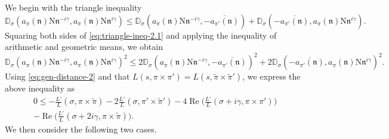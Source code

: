 \documentclass[12pt,reqno]{amsart}
\renewcommand{\tilde}{\widetilde}
\theoremstyle{remark}
\renewcommand{\tilde}{\widetilde}
\DeclareMathOperator{\Real}{Re}
\renewcommand{\tilde}{\widetilde}
\newcommand{\N}{\mathrm{N}}
\newcommand{\kn}{\mathfrak{n}}
\numberwithin{equation}{section}
\begin{document}
    We begin with the triangle inequality
	\begin{equation}
		\label{eq:triangle-ineq-2.1}
		\mathbb{D}_{\sigma}(a_{\pi}(\kn)\N\kn^{-i\gamma}, a_{\pi}(\kn)\N\kn^{i\gamma}) \le \mathbb{D}_{\sigma}(a_{\pi}(\kn)\N\kn^{-i\gamma}, -\overline{a_{\pi'}(\kn)}) +
		\mathbb{D}_{\sigma}(-\overline{a_{\pi'}(\kn)}, a_{\pi}(\kn)\N\kn^{i\gamma}).
	\end{equation}
    Squaring both sides of \eqref{eq:triangle-ineq-2.1} and applying the inequality of arithmetic and geometric means, we obtain
    \begin{equation*}
        \label{eq:triangle-ineq-2.2}
        \mathbb{D}_{\sigma}(a_{\pi}(\kn)\N\kn^{-i\gamma}, a_{\pi}(\kn)\N\kn^{i\gamma})^2 \le 2\mathbb{D}_{\sigma}(a_{\pi}(\kn)\N\kn^{-i\gamma}, -\overline{a_{\pi'}(\kn)})^2 +
		2\mathbb{D}_{\sigma}(-\overline{a_{\pi'}(\kn)}, a_{\pi}(\kn)\N\kn^{i\gamma})^2.
    \end{equation*}
    Using \eqref{eq:gen-distance-2}  and  that $L(s, \pi \times \pi') = L(s, \tilde{\pi} \times \tilde{\pi}')$, we express the above inequality as
	\begin{multline}
		\label{eq:rankin-6}
			0 \le -\frac{L'}{L}(\sigma, \pi \times \tilde{\pi}) -2\frac{L'}{L}(\sigma, \pi' \times \tilde{\pi}')  - 4\Real\Big(\frac{L'}{L}(\sigma + i\gamma, \pi \times \pi') \Big)\\
            -   \Real\Big(\frac{L'}{L}(\sigma + 2i\gamma, \pi \times \tilde{\pi}) \Big).
	\end{multline}
   We then consider the following two cases.
\end{document}
